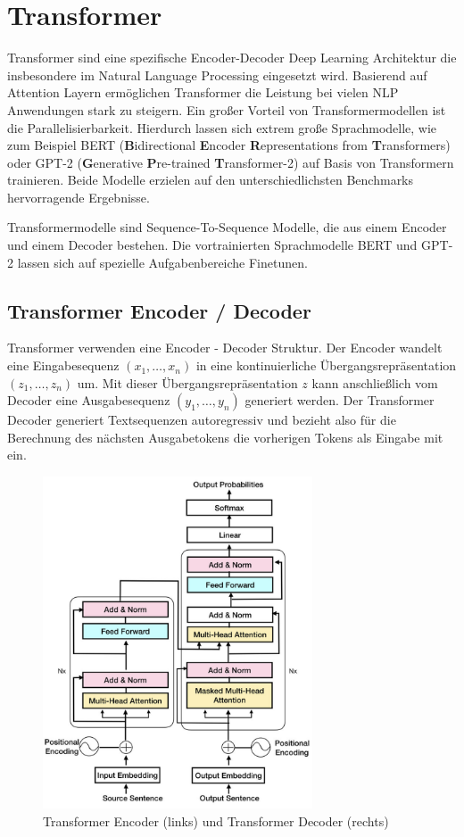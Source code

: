 \section{Transformer}\raggedbottom \label{transformer}
Transformer sind eine spezifische Encoder-Decoder Deep Learning Architektur die insbesondere im Natural Language Processing eingesetzt wird. 
Basierend auf Attention Layern ermöglichen Transformer die Leistung bei vielen NLP Anwendungen stark zu steigern. 
Ein großer Vorteil von Transformermodellen ist die Parallelisierbarkeit. 
Hierdurch lassen sich extrem große Sprachmodelle, wie zum Beispiel BERT (\textbf{B}idirectional \textbf{E}ncoder \textbf{R}epresentations from \textbf{T}ransformers) oder GPT-2 (\textbf{G}enerative \textbf{P}re-trained \textbf{T}ransformer-2) auf Basis von Transformern trainieren. 
Beide Modelle erzielen auf den unterschiedlichsten Benchmarks hervorragende Ergebnisse.

Transformermodelle sind Sequence-To-Sequence Modelle, die aus einem Encoder und einem Decoder bestehen.
Die vortrainierten Sprachmodelle BERT und GPT-2 lassen sich auf spezielle Aufgabenbereiche Finetunen.


\subsection{Transformer Encoder / Decoder}
Transformer verwenden eine Encoder - Decoder Struktur. Der Encoder wandelt eine Eingabesequenz $(x_1,\ldots,x_n)$ in eine kontinuierliche Übergangsrepräsentation $(z_1, \ldots, z_n)$ um. 
Mit dieser Übergangsrepräsentation $z$ kann anschließlich vom Decoder eine Ausgabesequenz $(y_1, \ldots, y_n)$ generiert werden.
Der Transformer Decoder generiert Textsequenzen autoregressiv und bezieht also für die Berechnung des nächsten Ausgabetokens die vorherigen Tokens als Eingabe mit ein.


\begin{figure}[h]
    \label{transformerfig}
    \centering
    \includegraphics[width=8cm]{bilder/Transformer-Encoder-Decoder}
    \caption{Transformer Encoder (links) und Transformer Decoder (rechts)}
\end{figure}


